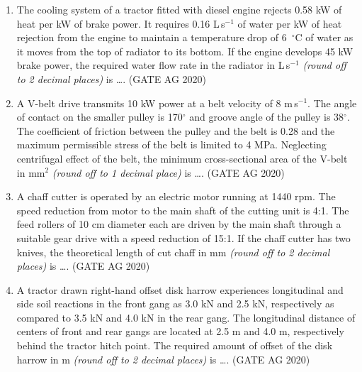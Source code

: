 \documentclass[journal]{IEEEtran}
\begin{document}
\begin{enumerate}
\medskip

\item
The cooling system of a tractor fitted with diesel engine rejects 0.58 kW of heat per kW of brake power. It requires 0.16 L\,s$^{-1}$ of water per kW of heat rejection from the engine to maintain a temperature drop of 6~$^\circ$C of water as it moves from the top of radiator to its bottom. If the engine develops 45 kW brake power, the required water flow rate in the radiator in L\,s$^{-1}$ \textit{(round off to 2 decimal places)} is \dots.
\hfill(GATE AG 2020)\\

\medskip

\item
A V-belt drive transmits 10 kW power at a belt velocity of 8 m\,s$^{-1}$. The angle of contact on the smaller pulley is 170$^\circ$ and groove angle of the pulley is 38$^\circ$. The coefficient of friction between the pulley and the belt is 0.28 and the maximum permissible stress of the belt is limited to 4 MPa. Neglecting centrifugal effect of the belt, the minimum cross-sectional area of the V-belt in mm$^2$ \textit{(round off to 1 decimal place)} is \dots.
\hfill(GATE AG 2020)\\

\medskip

\item
A chaff cutter is operated by an electric motor running at 1440 rpm. The speed reduction from motor to the main shaft of the cutting unit is 4:1. The feed rollers of 10 cm diameter each are driven by the main shaft through a suitable gear drive with a speed reduction of 15:1. If the chaff cutter has two knives, the theoretical length of cut chaff in mm \textit{(round off to 2 decimal places)} is \dots.
\hfill(GATE AG 2020)\\

\medskip

\item
A tractor drawn right-hand offset disk harrow experiences longitudinal and side soil reactions in the front gang as 3.0 kN and 2.5 kN, respectively as compared to 3.5 kN and 4.0 kN in the rear gang. The longitudinal distance of centers of front and rear gangs are located at 2.5 m and 4.0 m, respectively behind the tractor hitch point. The required amount of offset of the disk harrow in m \textit{(round off to 2 decimal places)} is \dots.
\hfill(GATE AG 2020)\\

\medskip


\end{enumerate}
\end{document}
